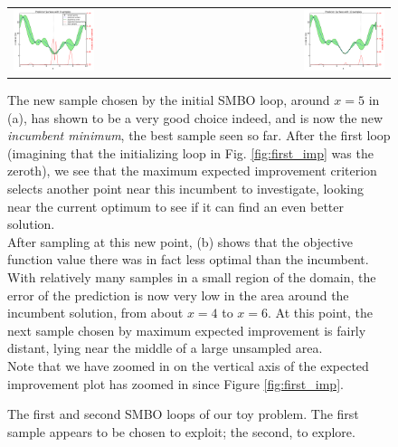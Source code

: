 \begin{figure}
\centering
\begin{tabular}{lr}

\subcaptionbox{}
{\includegraphics[width=0.45\textwidth]{images/ego_ex/1}} &

\subcaptionbox{}
{\includegraphics[width=0.45\textwidth]{images/ego_ex/2}} \\
\end{tabular}
\caption{The first and second SMBO loops of our toy problem. The first sample appears to be chosen to exploit; the second, to explore.\\}


\begin{minipage}{\textwidth}

The new sample chosen by the initial SMBO loop, around $x=5$ in (a), has shown to be a very good choice indeed, and is now the new \emph{incumbent minimum}, the best sample seen so far. After the first loop (imagining that the initializing loop in Fig. \ref{fig:first_imp} was the zeroth), we see that the maximum expected improvement criterion selects another point near this incumbent to investigate, looking near the current optimum to see if it can find an even better solution. \\

After sampling at this new point, (b) shows that the objective function value there was in fact less optimal than the incumbent. With relatively many samples in a small region of the domain, the error of the prediction is now very low in the area around the incumbent solution, from about $x=4$ to $x=6$. At this point, the next sample chosen by maximum expected improvement is fairly distant, lying near the middle of a large unsampled area.\\

Note that we have zoomed in on the vertical axis of the expected improvement plot has zoomed in since Figure \ref{fig:first_imp}.

\end{minipage}


\label{fig:explore_exploit}
\end{figure}



